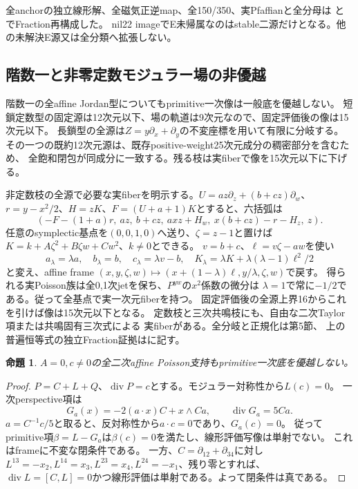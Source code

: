 \documentclass[a4paper,11pt]{ltjsarticle}
\newtheorem{proposition}{命題}[section]
\theoremstyle{definition}
\begin{document}
全anchorの独立線形解、全磁気正逆map、全150/350、実Pfaffianと全分母は
と
でFraction再構成した。
nil22 imageでE未帰属なのはstable二源だけとなる。他の未解決E源又は全分類へ拡張しない。

\subsection{階数一と非零定数モジュラー場の非優越}
階数一の全affine Jordan型についてもprimitive一次像は一般底を優越しない。
短鎖定数型の固定源は12次元以下、場の軌道は9次元なので、固定評価後の像は15次元以下。
長鎖型の全源は$Z=y\partial_x+\partial_y$の不変座標を用いて有限に分岐する。
その一つの既約12次元源は、既存positive-weight25次元成分の稠密部分を含むため、
全飽和閉包が同成分に一致する。残る枝は実fiberで像を15次元以下に下げる。

非定数枝の全源で必要な実fiberを明示する。$U=az\partial_z+(b+cz)\partial_w$、
$r=y-x^2/2$、$H=zK$、$F=(U+a+1)K$とすると、六括弧は
\[
 (-F-(1+a)r,\ az,\ b+cz,\ axz+H_w,\ x(b+cz)-r-H_z,\ z).
\]
任意のsymplectic基点を$(0,0,1,0)$へ送り、$\zeta=z-1$と置けば
$K=k+A\zeta^2+B\zeta w+Cw^2$、$k\ne0$とできる。
$v=b+c$、$\ell=v\zeta-aw$を使い
\[
 a_\lambda=\lambda a,\quad b_\lambda=b,\quad c_\lambda=\lambda v-b,
 \quad K_\lambda=\lambda K+\lambda(\lambda-1)\ell^2/2
\]
と変え、affine frame
$(x,y,\zeta,w)\mapsto(x+(1-\lambda)\ell,y/\lambda,\zeta,w)$で戻す。
得られる実Poisson族は全0,1次jetを保ち、$P^{yw}$の$x^2$係数の微分は
$\lambda=1$で常に$-1/2$である。従って全基点で実一次元fiberを持つ。
固定評価後の全源上界16からこれを引けば像は15次元以下となる。
定数枝と三次共鳴枝にも、自由な二次Taylor項または共鳴固有三次式による
実fiberがある。全分岐と正規化は第5節、
上の普遍恒等式の独立Fraction証拠はに記す。

\begin{proposition}\label{prop:constant-modular-beta}
$A=0,c\ne0$の全二次affine Poisson支持もprimitive一次底を優越しない。
\end{proposition}
\begin{proof}
$P=C+L+Q$、$\operatorname{div}P=c$とする。モジュラー対称性から$L(c)=0$。
一次perspective項は
\[
 G_a(x)=-2(a\cdot x)C+x\wedge Ca,\qquad\operatorname{div}G_a=5Ca.
\]
$a=C^{-1}c/5$と取ると、反対称性から$a\cdot c=0$であり、$G_a(c)=0$。
従ってprimitive項$\beta=L-G_a$は$\beta(c)=0$を満たし、線形評価写像は単射でない。
これはframeに不変な閉条件である。
一方、$C=\partial_{12}+\partial_{34}$に対し
$L^{13}=-x_2,L^{14}=x_3,L^{23}=x_4,L^{24}=-x_1$、残り零とすれば、
$\operatorname{div}L=[C,L]=0$かつ線形評価は単射である。よって閉条件は真である。
\end{proof}
\end{document}
